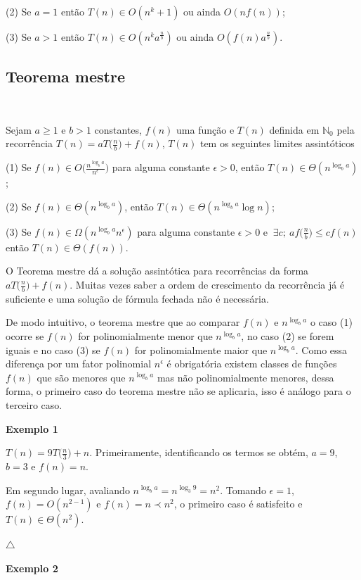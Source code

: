 (2) Se $a=1$ então $T(n) \in O(n^k+1)$ ou ainda $O(nf(n))$;

(3) Se $a>1$ então $T(n) \in O(n^ka^{\frac{n}{b}})$ ou ainda $O(f(n)a^{\frac{n}{b}})$.

\subsection{Teorema mestre}
\

Sejam $a\geq 1$ e $b>1$ constantes, $f(n)$ uma função e $T(n)$ definida em $\mathbb{N}_0$ pela recorrência $T(n) = aT\Bigr(\frac{n}{b}\Bigr) + f(n)$, $T(n)$ tem os seguintes limites assintóticos

(1) Se $f(n) \in O\Bigr(\frac{n^{\log_ba}}{n^\epsilon}\Bigr)$ para alguma constante $\epsilon>0$, então $T(n) \in \Theta(n^{\log_ba})$;

(2) Se $f(n) \in \Theta(n^{\log_ba})$, então $T(n) \in \Theta(n^{\log_ba} \log n)$;

(3) Se $f(n) \in \Omega(n^{\log_ba}n^\epsilon)$ para alguma constante $\epsilon>0$ e $ \ \exists c; \ af\Bigr(\frac{n}{b}\Bigr)\leq cf(n) $ então $T(n) \in \Theta(f(n))$.


O Teorema mestre dá a solução assintótica para recorrências da forma $aT\Bigr(\frac{n}{b}\Bigr) + f(n)$. Muitas vezes saber a ordem de crescimento da recorrência já é suficiente e uma solução de fórmula fechada não é necessária.

De modo intuitivo, o teorema mestre que ao comparar $f(n)$ e $n^{\log_ba}$ o caso (1) ocorre se $f(n)$ for polinomialmente menor que $n^{\log_ba}$, no caso (2) se forem iguais e no caso (3) se $f(n)$ for polinomialmente maior que $n^{\log_ba}$. Como essa diferença por um fator polinomial $n^\epsilon$ é obrigatória existem classes de funções $f(n)$ que são menores que $n^{\log_ba}$ mas não polinomialmente menores, dessa forma, o primeiro caso do teorema mestre não se aplicaria, isso é análogo para o terceiro caso.

\textbf{Exemplo 1}

$T(n)=9T\Bigr(\frac{n}{3}\Bigr) + n$. Primeiramente, identificando os termos se obtém, $a=9$, $b=3$ e $f(n)=n$.

Em segundo lugar, avaliando $n^{\log_ba}=n^{\log_3 9} = n^2$. Tomando $\epsilon = 1$, $f(n) = O(n^{2-1})$ e $f(n) = n \prec n^2$, o primeiro caso é satisfeito e $T(n) \in \Theta(n^2).$

{\raggedleft $\bigtriangleup$ \par}

\textbf{Exemplo 2}

